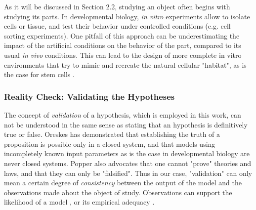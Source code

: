 As it will be discussed in Section 2.2, studying an object often begins with studying its parts. In developmental biology, \textit{in vitro} experiments allow to isolate cells or tissue, and test their behavior under controlled conditions (e.g. cell sorting experiments). One pitfall of this approach can be underestimating the impact of the artificial conditions on the behavior of the part, compared to its usual \textit{in vivo} conditions. This can lead to the design of more complete in vitro environments that try to mimic and recreate the natural cellular "habitat", as is the case for stem cells \cite{Nishikawa:2007jl}.


\subsubsection{Reality Check: Validating the Hypotheses}


The concept of \textit{validation} of a hypothesis, which is employed in this work, can not be understood in the same sense as stating that an hypothesis is definitively true or false. Oreskes \cite{Oreskes:1994gn} has demonstrated that establishing the truth of a proposition is possible only in a closed system, and that models using incompletely known input parameters as is the case in developmental biology are never closed systems. Popper \cite{Popper:1959uo} also advocates that one cannot "prove" theories and laws, and that they can only be "falsified". Thus in our case, "validation" can only mean a certain degree of \textit{consistency} between the output of the model and the observations made about the object of study. Observations can support the likelihood of a model \cite{Oreskes:1994gn}, or its empirical adequacy \cite{vanFraassen:1980uy}.

